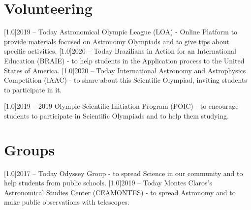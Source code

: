 \documentclass[]{cv-style}
\begin{document}
\section{Volunteering}
    \vspace{-0.2cm}
    \begin{entrylist}
        \entry
            {\scalebox{.8}[1.0]{2019 -- Today}}
            {Astronomical Olympic League (LOA) - {}}
            {Online Platform}
            { to provide materials focused on Astronomy Olympiads and to give tips about specific activities.}
        \entry 
            {\scalebox{.8}[1.0]{2020 -- Today}}
            {Brazilians in Action for an International Education (BRAIE) - }
            {}
            { to help students in the Application process to the United States of America.}
        \entry
            {\scalebox{.8}[1.0]{2020 -- Today}}
            {International Astronomy and Astrophysics Competition (IAAC) - }
            {}
            { to share about this Scientific Olympiad, inviting students to participate in it.}
    \end{entrylist}
\newpage
    \begin{entrylist}
        \entry
            {\scalebox{.8}[1.0]{2019 -- 2019}}
            {Olympic Scientific Initiation Program (POIC) - {}}
            {}
            { to encourage students to participate in Scientific Olympiads and to help them studying.}
    \end{entrylist}

\section{Groups}
    \vspace{-0.2cm}
    \begin{entrylist}
        \entry
            {\scalebox{.8}[1.0]{2017 -- Today}}
            {Odyssey Group - {}}
            {}
            { to spread Science in our community and to help students from public schools.}
        \entry
            {\scalebox{.8}[1.0]{2019 -- Today}}
            {Montes Claros's Astronomical Studies Center (CEAMONTES) - {}}
            {}
            { to spread Astronomy and to make public observations with telescopes.}
    \end{entrylist}
\end{document}
